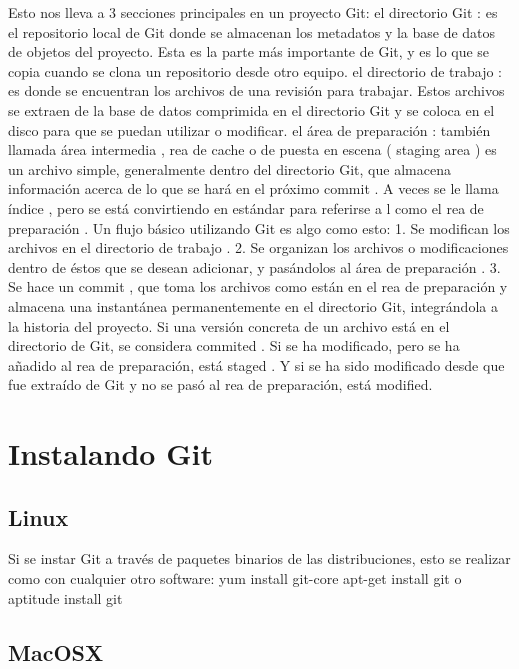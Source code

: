 \documentclass[12pt, spanish, oneside, onecolumn, a4paper]{report}
\begin{document}
Esto nos lleva a 3 secciones principales en un proyecto Git:
el directorio Git : es el repositorio local de Git donde se almacenan los metadatos y la base de datos de objetos del proyecto. Esta es la parte más importante de Git, y es lo que se copia cuando se clona un repositorio desde otro equipo.
el directorio de trabajo : es donde se encuentran los archivos de una revisión para trabajar. Estos archivos se extraen de la base de datos comprimida en el directorio Git y se coloca en el disco para que se puedan utilizar o modificar.
el área de preparación : también llamada área intermedia , rea de cache o de puesta en escena ( staging area ) es un archivo simple, generalmente dentro del directorio Git, que almacena información acerca de lo que se hará en el próximo commit . A veces se le llama  índice , pero se está convirtiendo en estándar para referirse a l como el rea de preparación .
Un flujo básico utilizando Git es algo como esto:
1. Se modifican los archivos en el directorio de trabajo .
2. Se organizan los archivos o modificaciones dentro de éstos que se desean adicionar, y pasándolos al área de preparación .
3. Se hace un commit , que toma los archivos como están en el rea de preparación y almacena una instantánea permanentemente en el directorio Git, integrándola a la historia del proyecto.
Si una versión concreta de un archivo está en el directorio de Git, se considera commited . Si se ha modificado, pero se ha añadido al rea de preparación, está staged . Y si se ha sido modificado desde que fue extraído de Git y no se pasó al rea de preparación, está modified.


\section{Instalando Git}
\label{sec:install}


\subsection{Linux}
\label{sec:installlinux}


Si se instar Git a través de paquetes binarios de las distribuciones, esto se realizar como con cualquier otro software:
 yum install git-core
 apt-get install git
o
 aptitude install git

 \subsection{MacOSX}
 \label{sec:installmac}
\end{document}
